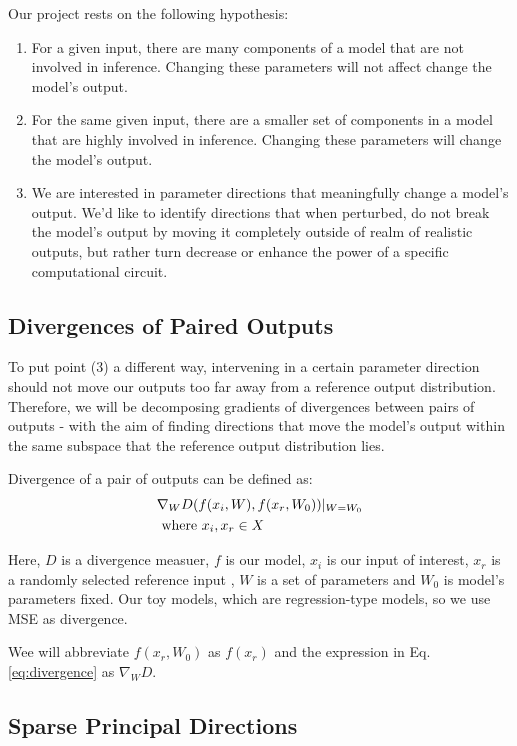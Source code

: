 \documentclass{article}
\theoremstyle{plain}
\theoremstyle{definition}
\theoremstyle{remark}
\begin{document}
Our project rests on the following hypothesis: 

\begin{enumerate}
    \item For a given input, there are many components of a model that are not involved in inference. Changing these parameters will not affect change the model's output. 
    \item For the same given input, there are a smaller set of components in a model that are highly involved in inference. Changing these parameters will change the model's output.
    \item We are interested in parameter directions that meaningfully change a model's output. We'd like to identify directions that when perturbed, do not break the model's output by moving it completely outside of realm of realistic outputs, but rather turn decrease or enhance the power of a specific computational circuit. 
\end{enumerate}

\subsection{Divergences of Paired Outputs}\label{sec:criteria}
To put point (3) a different way, intervening in a certain parameter direction should not move our outputs too far away from a reference output distribution. Therefore, we will be decomposing gradients of divergences between pairs of outputs - with the aim of finding directions that move the model's output within the same subspace that the reference output distribution lies. 

Divergence of a pair of outputs can be defined as:
\begin{align}\label{eq:divergence}
    &\nabla_W D(f(x_i, W), f(x_r, W_0))|_{W=W_0} \\
    &\text{ where } x_i, x_r \in X \notag
\end{align}


Here, $D$ is a divergence measuer, $f$ is our model, $x_i$ is our input of interest, $x_r$ is a randomly selected reference input , $W$ is a set of parameters and $W_0$ is model's parameters fixed. Our toy models, which are regression-type models, so we use MSE as divergence.

Wee will abbreviate $f(x_r, W_0)$ as $f(x_r)$ and the expression in Eq. \ref{eq:divergence} as $\nabla_W D$.

\subsection{Sparse Principal Directions}\label{sec:decomposition}
\end{document}
